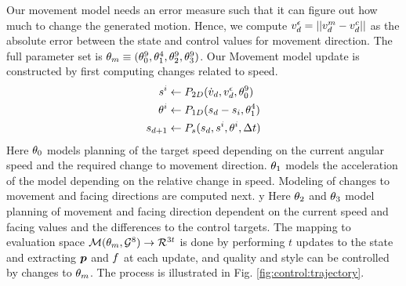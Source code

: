 Our movement model needs an error measure such that it can figure out how much to change the generated motion. Hence, we compute $v^\epsilon_d=||v_d^m-v^c_d||$ as the absolute error between the state and control values for movement direction. 
%
The full parameter set is $\theta_{m}\equiv(\theta_0^9,\theta_1^4,\theta_2^9,\theta_3^9)$. 
%
Our Movement model update is constructed by first computing  changes related to speed. 
\begin{subequations}
\begin{align}
    s^i&\leftarrow{}P_{2D}({\dot{v}}_d,v^\epsilon_d,\theta_0^9)\\
    \theta^i&\leftarrow{}P_{1D}(s_d-s_i, \theta_1^4)\\
    s_{d+1}&\leftarrow{}P_s(s_d,s^i,\theta^i,\Delta{t})
\end{align}
\end{subequations}
Here $\theta_0$  models planning of the target speed depending on the current angular speed and the required change to movement direction. $\theta_1$ models the acceleration of the model depending on the relative change in speed.
%
Modeling of changes to movement and facing directions are computed next. 
y
Here $\theta_2$ and $\theta_3$ model planning of movement and facing direction dependent on the current speed and facing values and the differences to the control targets.
%
The mapping to evaluation space $\mathcal{M}(\theta_{m}, \mathcal{G}^{8}) \rightarrow \mathcal{R}^{3t}$ is done by performing $t$ updates to the state and extracting $\boldsymbol{p }$ and $f$ at each update, and quality and style can be controlled by changes to $\theta_{m}$.  The process is illustrated in Fig. \ref{fig:control:trajectory}. 

